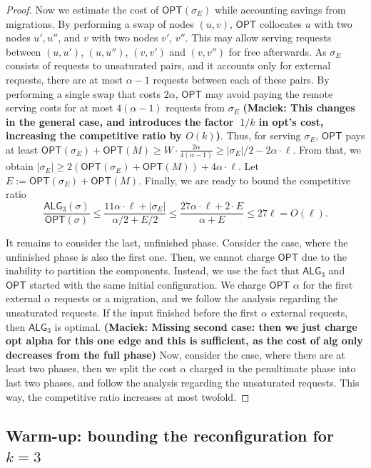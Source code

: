 \documentclass[manuscript,screen=true, review, anonymous]{acmart}
\newcommand{\OPT}{\textsf{OPT}\xspace}
\newcommand{\TAlg}{{\ensuremath{\textsf{ALG}_{3}}}\xspace}
\newcommand\maciek[1]{\color{brown}\textbf{(Maciek: #1)}\color{black}}
\begin{document}
\begin{proof}
	
	Now we estimate the cost of $\OPT(\sigma_E)$ while accounting savings from migrations.
	By performing a swap of nodes $(u,v)$, $\OPT$ collocates $u$ with two nodes $u', u''$, and $v$ with two nodes $v'$, $v''$.
	This may allow serving requests between $(u,u')$, $(u,u'')$, $(v,v')$ and $(v,v'')$ for free afterwards.
	As $\sigma_E$ consists of requests to unsaturated pairs, and it accounts only for external requests, there are at most $\alpha-1$ requests between each of these pairs.
	By performing a single swap that costs $2\alpha$, $\OPT$ may avoid paying the remote serving costs for at most $4 (\alpha - 1)$ requests from $\sigma_E$
	\maciek{This changes in the general case, and introduces the factor $~1/k$ in opt's cost, increasing the competitive ratio by $O(k)$}.
	Thus, for serving $\sigma_E$, $\OPT$ pays at least $\OPT(\sigma_E) + \OPT(M) \geq W \cdot \frac{2\alpha}{4 (\alpha-1)}\geq |\sigma_E| / 2 - 2 \alpha \cdot \ell$.
	From that, we obtain $|\sigma_E| \geq 2(\OPT(\sigma_E)+\OPT(M)) + 4\alpha \cdot \ell$.
	Let $E := \OPT(\sigma_E) + \OPT(M)$. Finally, we are ready to bound the competitive ratio
	\begin{equation*}
		\frac{\TAlg(\sigma)}{\OPT(\sigma)} \leq \frac{11\alpha \cdot \ell + |\sigma_E|}{\alpha/2 + E/2} \leq \frac{27\alpha\cdot\ell + 2\cdot E}{\alpha + E} \leq 27 \ell = O(\ell).
	\end{equation*}
	
	\medskip
	
	It remains to consider the last, unfinished phase.
	Consider the case, where the unfinished phase is also the first one.
	Then, we cannot charge $\OPT$ due to the inability to partition the components.
	Instead, we use the fact that \TAlg and $\OPT$ started with the same initial configuration.
	We charge $\OPT$ $\alpha$ for the first external $\alpha$ requests or a migration,
	and we follow the analysis regarding the unsaturated requests.
	If the input finished before the first $\alpha$ external requests, then \TAlg is optimal.
	\maciek{Missing second case: then we just charge opt alpha for this one edge and this is sufficient, as the cost of alg only decreases from the full phase}
	Now, consider the case, where there are at least two phases, then we split the cost $\alpha$ charged in the penultimate phase into last two phases, and follow the analysis regarding the unsaturated requests.
	This way, the competitive ratio increases at most twofold.
\end{proof}


\subsection{Warm-up: bounding the reconfiguration for $k=3$}
\end{document}
